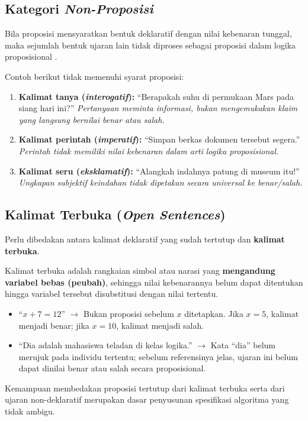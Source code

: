 \subsection{Kategori \textit{Non-Proposisi}}

Bila proposisi mensyaratkan bentuk deklaratif dengan nilai kebenaran tunggal, maka sejumlah bentuk ujaran lain tidak diproses sebagai proposisi dalam logika proposisional \cite{wiki_first_order_logic}.

\begin{contoh}
Contoh berikut tidak memenuhi syarat proposisi:
\begin{enumerate}
    \item \textbf{Kalimat tanya (\textit{interogatif}):} ``Berapakah suhu di permukaan Mars pada siang hari ini?'' \textit{Pertanyaan meminta informasi, bukan mengemukakan klaim yang langsung bernilai benar atau salah.}
    \item \textbf{Kalimat perintah (\textit{imperatif}):} ``Simpan berkas dokumen tersebut segera.'' \textit{Perintah tidak memiliki nilai kebenaran dalam arti logika proposisional.}
    \item \textbf{Kalimat seru (\textit{eksklamatif}):} ``Alangkah indahnya patung di museum itu!'' \textit{Ungkapan subjektif keindahan tidak dipetakan secara universal ke benar/salah.}
\end{enumerate}
\end{contoh}

\subsection{Kalimat Terbuka (\textit{Open Sentences})}

Perlu dibedakan antara kalimat deklaratif yang sudah tertutup dan \textbf{kalimat terbuka}.

\begin{definisi}
Kalimat terbuka adalah rangkaian simbol atau narasi yang \textbf{mengandung variabel bebas (peubah)}, sehingga nilai kebenarannya belum dapat ditentukan hingga variabel tersebut disubstitusi dengan nilai tertentu.
\end{definisi}

\begin{contoh}
    \begin{itemize}
        \item ``$x + 7 = 12$'' \quad $\rightarrow$ Bukan proposisi sebelum $x$ ditetapkan. Jika $x = 5$, kalimat menjadi benar; jika $x = 10$, kalimat menjadi salah.
        \item ``Dia adalah mahasiswa teladan di kelas logika.'' \quad $\rightarrow$ Kata ``dia'' belum merujuk pada individu tertentu; sebelum referensinya jelas, ujaran ini belum dapat dinilai benar atau salah secara proposisional.
    \end{itemize}
\end{contoh}

Kemampuan membedakan proposisi tertutup dari kalimat terbuka serta dari ujaran non-deklaratif merupakan dasar penyusunan spesifikasi algoritma yang tidak ambigu.
